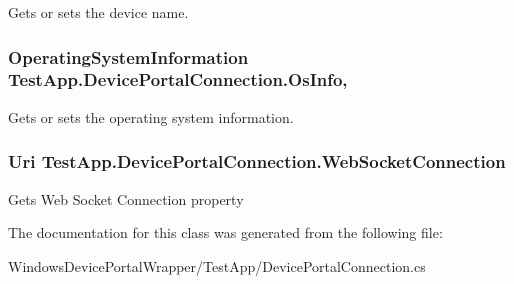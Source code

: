Gets or sets the device name. 

\subsubsection[{\texorpdfstring{Os\+Info}{OsInfo}}]{\setlength{\rightskip}{0pt plus 5cm}Operating\+System\+Information Test\+App.\+Device\+Portal\+Connection.\+Os\+Info\hspace{0.3cm}{\ttfamily [get]}, {\ttfamily [set]}}\hypertarget{class_test_app_1_1_device_portal_connection_ac531c87ac9d12230dc2a7412f252772c}{}\label{class_test_app_1_1_device_portal_connection_ac531c87ac9d12230dc2a7412f252772c}


Gets or sets the operating system information. 

\subsubsection[{\texorpdfstring{Web\+Socket\+Connection}{WebSocketConnection}}]{\setlength{\rightskip}{0pt plus 5cm}Uri Test\+App.\+Device\+Portal\+Connection.\+Web\+Socket\+Connection\hspace{0.3cm}{\ttfamily [get]}}\hypertarget{class_test_app_1_1_device_portal_connection_ad07bc1954359a55373a25ff9de046537}{}\label{class_test_app_1_1_device_portal_connection_ad07bc1954359a55373a25ff9de046537}


Gets Web Socket Connection property 



The documentation for this class was generated from the following file\+:\begin{DoxyCompactItemize}
\item 
Windows\+Device\+Portal\+Wrapper/\+Test\+App/Device\+Portal\+Connection.\+cs\end{DoxyCompactItemize}
